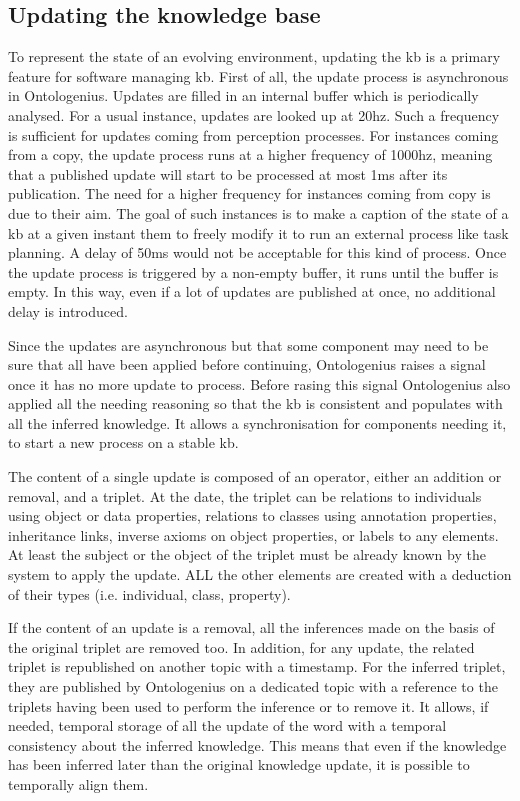 \subsection{Updating the knowledge base}

To represent the state of an evolving environment, updating the \acrshort{kb} is a primary feature for software managing \acrshort{kb}. First of all, the update process is asynchronous in Ontologenius. Updates are filled in an internal buffer which is periodically analysed. For a usual instance, updates are looked up at 20hz. Such a frequency is sufficient for updates coming from perception processes. For instances coming from a copy, the update process runs at a higher frequency of 1000hz, meaning that a published update will start to be processed at most 1ms after its publication. The need for a higher frequency for instances coming from copy is due to their aim. The goal of such instances is to make a caption of the state of a \acrshort{kb} at a given instant them to freely modify it to run an external process like task planning. A delay of 50ms would not be acceptable for this kind of process. Once the update process is triggered by a non-empty buffer, it runs until the buffer is empty. In this way, even if a lot of updates are published at once, no additional delay is introduced.

Since the updates are asynchronous but that some component may need to be sure that all have been applied before continuing, Ontologenius raises a signal once it has no more update to process. Before rasing this signal Ontologenius also applied all the needing reasoning so that the \acrshort{kb} is consistent and populates with all the inferred knowledge. It allows a synchronisation for components needing it, to start a new process on a stable \acrshort{kb}.

The content of a single update is composed of an operator, either an addition or removal, and a triplet. At the date, the triplet can be relations to individuals using object or data properties, relations to classes using annotation properties, inheritance links, inverse axioms on object properties, or labels to any elements. At least the subject or the object of the triplet must be already known by the system to apply the update. ALL the other elements are created with a deduction of their types (i.e. individual, class, property).

If the content of an update is a removal, all the inferences made on the basis of the original triplet are removed too. In addition, for any update, the related triplet is republished on another topic with a timestamp. For the inferred triplet, they are published by Ontologenius on a dedicated topic with a reference to the triplets having been used to perform the inference or to remove it. It allows, if needed, temporal storage of all the update of the word with a temporal consistency about the inferred knowledge. This means that even if the knowledge has been inferred later than the original knowledge update, it is possible to temporally align them.

